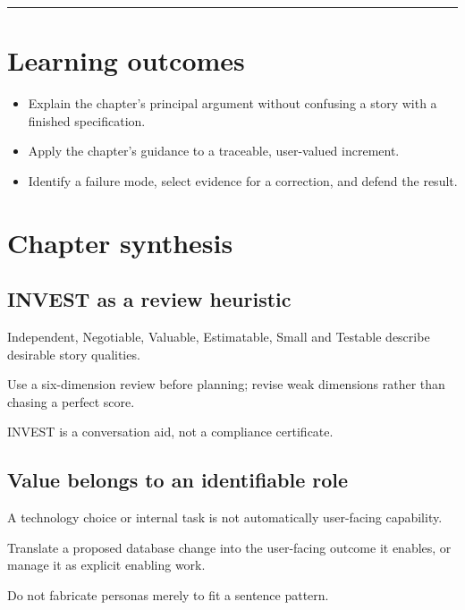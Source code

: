 \documentclass[11pt,letterpaper]{article}
\begin{document}
\tableofcontents\medskip\noindent\rule{\linewidth}{0.4pt}\medskip
\section{Learning outcomes}
\begin{itemize}[leftmargin=*,itemsep=2pt]
\item Explain the chapter's principal argument without confusing a story with a finished specification.
\item Apply the chapter's guidance to a traceable, user-valued increment.
\item Identify a failure mode, select evidence for a correction, and defend the result.
\end{itemize}
\section{Chapter synthesis}
\subsection{INVEST as a review heuristic}
Independent, Negotiable, Valuable, Estimatable, Small and Testable describe desirable story qualities.

\begin{tcolorbox}[colback=tealback,colframe=navy,title={Engineering translation},breakable]
Use a six-dimension review before planning; revise weak dimensions rather than chasing a perfect score.

\end{tcolorbox}
\begin{tcolorbox}[colback=amberback,colframe=navy,title={Failure mode to watch},breakable]
INVEST is a conversation aid, not a compliance certificate.

\end{tcolorbox}
\subsection{Value belongs to an identifiable role}
A technology choice or internal task is not automatically user-facing capability.

\begin{tcolorbox}[colback=tealback,colframe=navy,title={Engineering translation},breakable]
Translate a proposed database change into the user-facing outcome it enables, or manage it as explicit enabling work.

\end{tcolorbox}
\begin{tcolorbox}[colback=amberback,colframe=navy,title={Failure mode to watch},breakable]
Do not fabricate personas merely to fit a sentence pattern.

\end{tcolorbox}
\end{document}
